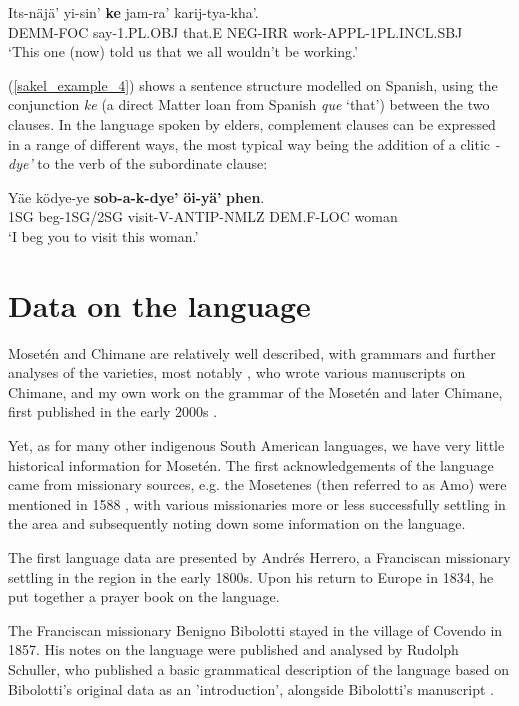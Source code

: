 \documentclass[output=paper,colorlinks,citecolor=brown
]{langscibook}
\begin{document}
\ea \label{sakel_example_4}
\gll Its-näjä’ 	yi-sin’ 		\textbf{ke} 	jam-ra’ 	karij-tya-kha’.\\
     DEM\textsc{M}-FOC  say-1.PL.OBJ    that.E  NEG-IRR work-APPL-1PL.INCL.SBJ\\
\glt ‘This one (now) told us that we all wouldn’t be working.’
\z

(\ref{sakel_example_4}) shows a sentence structure modelled on Spanish, using the conjunction \textit{ke} (a direct Matter loan from Spanish \textit{que} ‘that’) between the two clauses. In the language spoken by elders, complement clauses can be expressed in a range of different ways, the most typical way being the addition of a clitic \textit{-dye’} to the verb of the subordinate clause:

\ea \label{sakel_example_5}
\gll Yäe  	ködye-ye  	\textbf{sob-a-k-dye’}  		\textbf{öi-yä’}  		\textbf{phen}.\\
     1SG	beg-1SG/2SG	visit-V-ANTIP-NMLZ	DEM.F-LOC	woman\\
\glt ‘I beg you to visit this woman.’
\z

\section{Data on the language}
Mosetén and Chimane are relatively well described, with grammars and further analyses of the varieties, most notably \citep{gill1999pedagogical}, who wrote various manuscripts on Chimane, and my own work on the grammar of the Mosetén and later Chimane, first published in the early 2000s \citep{sakel2004grammar}.

Yet, as for many other indigenous South American languages, we have very little historical information for Mosetén. The first acknowledgements of the language came from missionary sources, e.g. the Mosetenes (then referred to as Amo) were mentioned in 1588 \citep{metraux1942native}, with various missionaries more or less successfully settling in the area and subsequently noting down some information on the language. 

The first language data are presented by Andrés Herrero, a Franciscan missionary settling in the region in the early 1800s. Upon his return to Europe in 1834, he put together a prayer book on the language.

The Franciscan missionary Benigno Bibolotti stayed in the village of Covendo in 1857. His notes on the language were published and analysed by Rudolph Schuller, who published a basic grammatical description of the language based on Bibolotti’s original data as an 'introduction', alongside Bibolotti’s manuscript \citep{bibolotti1917moseteno, schuller1917introduction}. 
\end{document}
